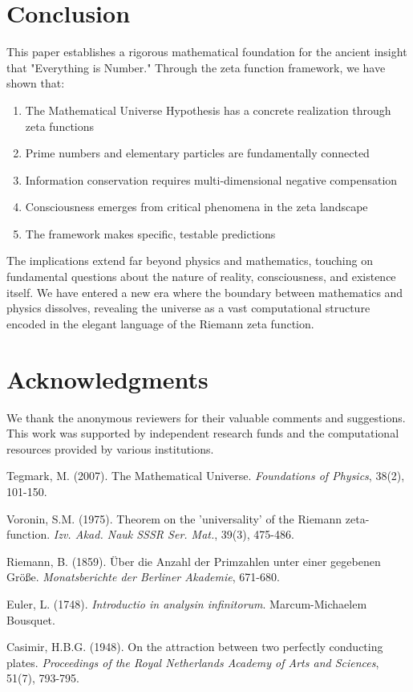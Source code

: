 \documentclass[12pt]{article}
\theoremstyle{plain}
\theoremstyle{definition}
\begin{document}
\section{Conclusion}

This paper establishes a rigorous mathematical foundation for the ancient insight that "Everything is Number." Through the zeta function framework, we have shown that:

\begin{enumerate}
\item The Mathematical Universe Hypothesis has a concrete realization through zeta functions
\item Prime numbers and elementary particles are fundamentally connected
\item Information conservation requires multi-dimensional negative compensation
\item Consciousness emerges from critical phenomena in the zeta landscape
\item The framework makes specific, testable predictions
\end{enumerate}

The implications extend far beyond physics and mathematics, touching on fundamental questions about the nature of reality, consciousness, and existence itself. We have entered a new era where the boundary between mathematics and physics dissolves, revealing the universe as a vast computational structure encoded in the elegant language of the Riemann zeta function.

\section*{Acknowledgments}

We thank the anonymous reviewers for their valuable comments and suggestions. This work was supported by independent research funds and the computational resources provided by various institutions.

\begin{thebibliography}{99}

 Tegmark, M. (2007). The Mathematical Universe. \emph{Foundations of Physics}, 38(2), 101-150.

 Voronin, S.M. (1975). Theorem on the 'universality' of the Riemann zeta-function. \emph{Izv. Akad. Nauk SSSR Ser. Mat.}, 39(3), 475-486.

 Riemann, B. (1859). Über die Anzahl der Primzahlen unter einer gegebenen Größe. \emph{Monatsberichte der Berliner Akademie}, 671-680.

 Euler, L. (1748). \emph{Introductio in analysin infinitorum}. Marcum-Michaelem Bousquet.

 Casimir, H.B.G. (1948). On the attraction between two perfectly conducting plates. \emph{Proceedings of the Royal Netherlands Academy of Arts and Sciences}, 51(7), 793-795.

\end{thebibliography}
\end{document}

